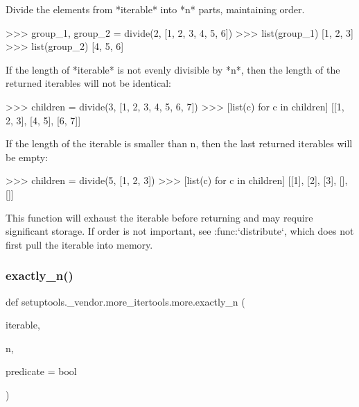\begin{DoxyVerb}Divide the elements from *iterable* into *n* parts, maintaining
order.

    >>> group_1, group_2 = divide(2, [1, 2, 3, 4, 5, 6])
    >>> list(group_1)
    [1, 2, 3]
    >>> list(group_2)
    [4, 5, 6]

If the length of *iterable* is not evenly divisible by *n*, then the
length of the returned iterables will not be identical:

    >>> children = divide(3, [1, 2, 3, 4, 5, 6, 7])
    >>> [list(c) for c in children]
    [[1, 2, 3], [4, 5], [6, 7]]

If the length of the iterable is smaller than n, then the last returned
iterables will be empty:

    >>> children = divide(5, [1, 2, 3])
    >>> [list(c) for c in children]
    [[1], [2], [3], [], []]

This function will exhaust the iterable before returning and may require
significant storage. If order is not important, see :func:`distribute`,
which does not first pull the iterable into memory.\end{DoxyVerb}
 \mbox{\label{namespacesetuptools_1_1__vendor_1_1more__itertools_1_1more_a70e0e6affdf32d1da9ed7f03bd821338}} 
\subsubsection{\texorpdfstring{exactly\+\_\+n()}{exactly\_n()}}
{\footnotesize\ttfamily def setuptools.\+\_\+vendor.\+more\+\_\+itertools.\+more.\+exactly\+\_\+n (\begin{DoxyParamCaption}\item[{}]{iterable,  }\item[{}]{n,  }\item[{}]{predicate = {\ttfamily bool} }\end{DoxyParamCaption})}

